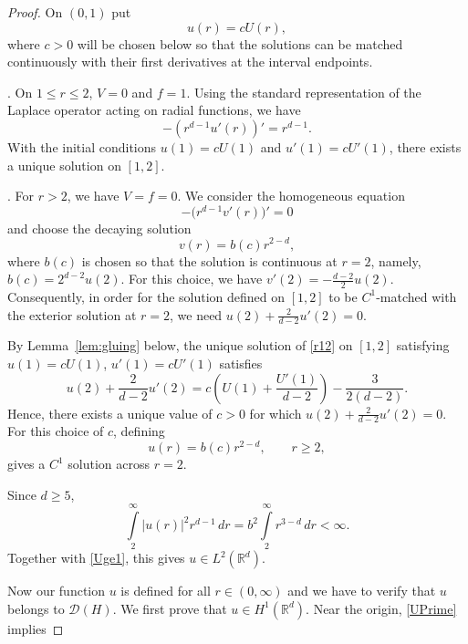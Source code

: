 \documentclass[11pt,reqno]{amsart}
\newcommand{\R}{{\mathbb R}}
\begin{document}
\begin{proof}
\par\medskip
On $(0,1)$ put
\begin{equation}\label{ucU}
u(r)=cU(r),
\end{equation}
where $c>0$ will be chosen below so that the solutions can be matched continuously with their first derivatives at the interval endpoints.
\par{}. On $1\le r \le 2$, $V=0$ and $f=1$. Using the standard representation of the Laplace operator acting on radial functions, we have
\begin{equation}\label{r12}
-\left(r^{d-1}u'(r)\right)'=r^{d-1}.
\end{equation}
With the initial conditions $u(1)=cU(1)$ and $u'(1)=cU'(1)$, there exists a unique solution on $[1,2]$.
\par{}. For $r>2$, we have $V=f=0$.  We consider the homogeneous equation
$$-\bigl(r^{d-1}v'(r)\bigr)'=0$$
and choose the decaying solution
$$v(r)=b(c)r^{2-d},$$
where $b(c)$ is chosen so that the solution is continuous at $r=2$, namely, $b(c)=2^{d-2}u(2)$. For this choice, we have $v'(2)=-\frac{d-2}{2}u(2)$.
Consequently, in order for the solution defined on $[1,2]$ to be $C^1$-matched with the exterior solution at $r=2$, we need $u(2)+\frac{2}{d-2}u'(2)=0$.
\par
\par
By Lemma~\ref{lem:gluing} below, the unique solution of \eqref{r12} on $[1,2]$ satisfying $u(1)=cU(1)$, $u'(1)=cU'(1)$ satisfies
$$u(2)+\frac{2}{d-2}u'(2)=c\left(U(1)+\frac{U'(1)}{d-2}\right)-\frac{3}{2(d-2)}.$$
Hence, there exists a unique value of $c>0$ for which $u(2)+\frac{2}{d-2}u'(2)=0$.
For this choice of $c$, defining
$$u(r)=b(c)r^{2-d},\qquad r\geq 2,$$
gives a $C^1$ solution across $r=2$.
\par\medskip
Since $d\ge 5$,
$$\int\limits_2^\infty |u(r)|^2r^{d-1}\,dr=b^2\int\limits_2^\infty r^{3-d}\,dr<\infty.$$
Together with \eqref{Uge1}, this gives $u\in L^2(\R^d)$.
\par\medskip
Now our function $u$ is defined for all $r\in (0,\infty)$ and we have to verify that $u$ belongs to $\mathcal{D}(H)$. We first prove that $u\in H^1(\R^d)$. Near the origin, \eqref{UPrime} implies

\end{proof}
\end{document}
